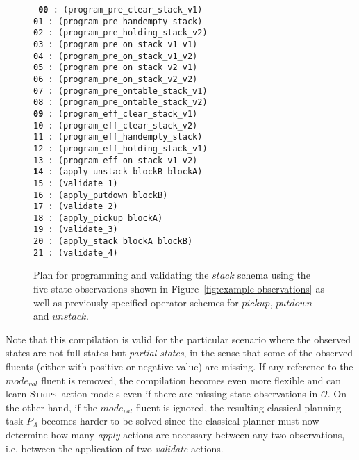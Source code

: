 \documentclass[3p,times]{elsarticle}
\newcommand{\strips}{\textsc{Strips}}     %
\begin{document}
\begin{figure}[hbt!]
{\footnotesize\tt
     {\bf 00} : (program\_pre\_clear\_stack\_v1)\\
     01 : (program\_pre\_handempty\_stack)\\
     02 : (program\_pre\_holding\_stack\_v2)\\
     03 : (program\_pre\_on\_stack\_v1\_v1)\\
     04 : (program\_pre\_on\_stack\_v1\_v2)\\
     05 : (program\_pre\_on\_stack\_v2\_v1)\\
     06 : (program\_pre\_on\_stack\_v2\_v2)\\
     07 : (program\_pre\_ontable\_stack\_v1)\\
     08 : (program\_pre\_ontable\_stack\_v2)\\
     {\bf 09} : (program\_eff\_clear\_stack\_v1)\\
    10 : (program\_eff\_clear\_stack\_v2)\\
    11 : (program\_eff\_handempty\_stack)\\
    12 : (program\_eff\_holding\_stack\_v1)\\
    13 : (program\_eff\_on\_stack\_v1\_v2)\\
    {\bf 14} : (apply\_unstack blockB blockA)\\
    15 : (validate\_1)\\
    16 : (apply\_putdown blockB)\\
    17 : (validate\_2)\\
    18 : (apply\_pickup blockA)\\
    19 : (validate\_3)\\
    20 : (apply\_stack blockA blockB)\\
    21 : (validate\_4)
}
 \caption{\small Plan for programming and validating the $stack$ schema using the five state observations shown in Figure~\ref{fig:example-observations} as well as previously specified operator schemes for $pickup$, $putdown$ and $unstack$.}
\label{fig:plan-observations}
\end{figure}

Note that this compilation is valid for the particular scenario where the observed states are not full states but {\em partial states}, in the sense that some of the observed fluents (either with positive or negative value) are missing. If any reference to the $mode_{val}$ fluent is removed, the compilation becomes even more flexible and can learn \strips\ action models even if there are missing state observations in $\mathcal{O}$. On the other hand, if the $mode_{val}$ fluent is ignored, the resulting classical planning task $P_{\Lambda}$ becomes harder to be solved since the classical planner must now determine how many {\em apply} actions are necessary between any two observations, i.e. between the application of two {\em validate} actions.  
\end{document}
